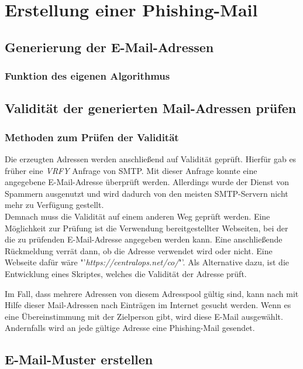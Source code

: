 
\chapter{Erstellung einer Phishing-Mail}  %
\label{cha:ErstellungeinerPhishing-Mail} %

\section{Generierung der E-Mail-Adressen}
	\subsection{Funktion des eigenen Algorithmus}
\section{Validität der generierten Mail-Adressen prüfen}
	\subsection{Methoden zum Prüfen der Validität}
	Die erzeugten Adressen werden anschließend auf Validität geprüft. Hierfür gab es früher eine \textit{VRFY} Anfrage von SMTP. Mit dieser Anfrage konnte eine angegebene E-Mail-Adresse überprüft werden. Allerdings wurde der Dienst von Spammern ausgenutzt und wird dadurch von den meisten SMTP-Servern nicht mehr zu Verfügung gestellt.\cite{balduzzi2010abusing}\\
	Demnach muss die Validität auf einem anderen Weg geprüft werden. Eine Möglichkeit zur Prüfung ist die Verwendung bereitgestellter Webseiten, bei der die zu prüfenden E-Mail-Adresse angegeben werden kann. Eine anschließende Rückmeldung verrät dann, ob die Adresse verwendet wird oder nicht. Eine Webseite dafür wäre "'\textit{https://centralops.net/co/}"'. Als Alternative dazu, ist die Entwicklung eines Skriptes, welches die Validität der Adresse prüft.
	
	Im Fall, dass mehrere Adressen von diesem Adresspool gültig sind, kann nach mit Hilfe dieser Mail-Adressen nach Einträgen im Internet gesucht werden. Wenn es eine Übereinstimmung mit der Zielperson gibt, wird diese E-Mail ausgewählt. Andernfalls wird an jede gültige Adresse eine Phishing-Mail gesendet. 
\section{E-Mail-Muster erstellen}
